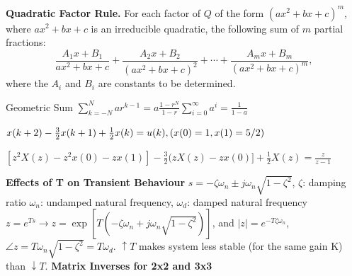 \medskip
\noindent
{\bf Quadratic Factor Rule.}  
 For each factor of $Q$ of the form $(ax^2+bx+c)^m$, 
 where $ax^2+bx+c$ is an irreducible quadratic, 
 the following sum of $m$ partial fractions:  
\[
\frac{A_1x+B_1}{ax^2+bx+c} + \frac{A_2x+B_2}{(ax^2+bx+c)^2} + \cdots 
  + \frac{A_mx+B_m}{(ax^2+bx+c)^m},
\]
 where the $A_i$ and $B_i$ are constants to be determined. 


Geometric Sum $\sum\limits_{k = -N}^{N} {ar^{k - 1} = a\frac{1-r^{N}}{{1 - r}}} \sum_{i=0}^\infty a^i=\frac{1}{1-a}$

$ x(k+2)-\frac{3}{2}x(k+1)+\frac{1}{2}x(k)=u(k), \text(x(0)=1,x(1)=5/2) $

$[z^2X(z)-z^2x(0)-zx(1)]-\frac{3}{2}(zX(z)-zx(0)]+\frac{1}{2}X(z)=\frac{z}{z-1}$


\textbf{Effects of T on Transient Behaviour} \hfill \break 
$s= -\zeta \omega_n \pm j \omega_n \sqrt{1-\zeta^2}$,  \hfill \break 
$\zeta$: damping ratio  \hfill \break 
$\omega_n$: undamped natural frequency,  \hfill \break 
$\omega_d$: damped natural frequency \hfill \break
$z=e^{Ts} \rightarrow z= \exp\left[T(-\zeta \omega_n +j\omega_n \sqrt{1-\zeta^2})\right]$, and
$|z|=e^{-T \zeta \omega_n}$, $\angle z = T \omega_n \sqrt{1-\zeta^2}= T \omega_d$. $\uparrow T$ makes system less stable (for the same gain K) than $\downarrow T$.
\textbf{Matrix Inverses for 2x2 and 3x3}
